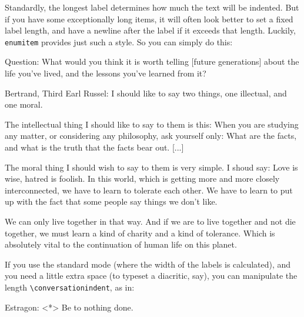 \documentclass{article}
\begin{document}
Standardly, the longest label determines how much the text will be indented. But 
if you have some exceptionally long items, it will often look better to set a 
fixed label length, and have a newline after the label if it exceeds
that length. Luckily, \verb|enumitem| provides just such a style. So you can 
simply do this:
\begin{examples}
    \item \begin{conversation}[leftmargin=2cm,style=nextline]
        \item[Question:] What would you think it is worth telling [future 
                         generations] about the life you've lived, and the 
                         lessons you've learned from it?
                         
        \item[Bertrand, Third Earl Russel:] 
              I should like to say two things, one illectual, and one moral.

              The intellectual thing I should like to say to them is this: When you
              are studying any matter, or considering any philosophy, ask yourself only:
              What are the facts, and what is the truth that the facts bear out. [...]

              The moral thing I should wish to say to them is very simple. I shoud say: Love is wise, hatred is foolish. In this world, which is getting more and
              more closely interconnected, we have to learn to tolerate each other. We
              have to learn to put up with the fact that some people say things we don't
              like. 

              We can only live together in that way. And if we are to live together and 
              not die together, we must learn a kind of charity and a kind of tolerance. 
              Which is absolutely vital to the continuation of human life on this planet.
                  \end{conversation}
\end{examples}
If you use the standard mode (where the width of the labels is calculated), and 
you need a little extra space (to typeset a diacritic, say),
you can manipulate the length \verb|\conversationindent|, as in:
\begin{examples}
  \setlength{\conversationindent}{1em} %
  \item \begin{conversation}
        \item[Estragon:]<*> Be to nothing done.  
    \end{conversation}  
\end{examples}
\end{document}
